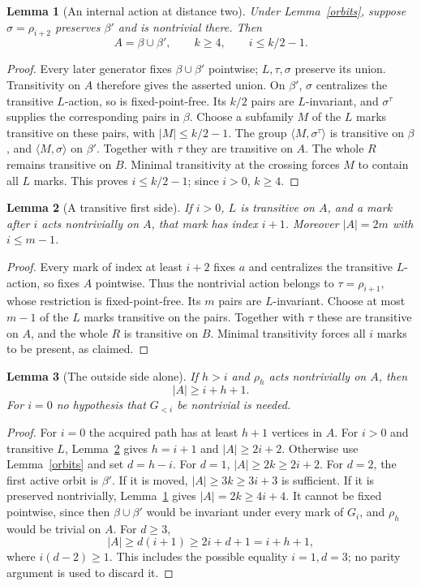 \documentclass[11pt,a4paper]{article}
\newtheorem{lemma}{Lemma}
\newcommand{\gen}[1]{\langle#1\rangle}
\begin{document}
\begin{lemma}[An internal action at distance two]\label{internal}
Under Lemma~\ref{orbits}, suppose $\sigma=\rho_{i+2}$
preserves $\beta'$ and is nontrivial there. Then
\[
              A=\beta\cup\beta',\qquad k\ge4,
              \qquad i\le k/2-1.
\]
\end{lemma}
\begin{proof}
Every later generator fixes $\beta\cup\beta'$ pointwise;
$L,\tau,\sigma$ preserve its union. Transitivity on $A$
therefore gives the asserted union. On $\beta'$, $\sigma$
centralizes the transitive $L$-action, so is fixed-point-free.
Its $k/2$ pairs are $L$-invariant, and $\sigma^\tau$ supplies
the corresponding pairs in $\beta$.
Choose a subfamily $M$ of the $L$ marks transitive on these
pairs, with $|M|\le k/2-1$. The group $\gen{M,\sigma^\tau}$
is transitive on $\beta$, and $\gen{M,\sigma}$ on $\beta'$.
Together with $\tau$ they are transitive on $A$. The whole
$R$ remains transitive on $B$. Minimal transitivity at the
crossing forces $M$ to contain all $L$ marks. This proves
$i\le k/2-1$; since $i>0$, $k\ge4$.
\end{proof}

\begin{lemma}[A transitive first side]\label{transitive}
If $i>0$, $L$ is transitive on $A$, and a mark after $i$
acts nontrivially on $A$, that mark has index $i+1$.
Moreover $|A|=2m$ with $i\le m-1$.
\end{lemma}
\begin{proof}
Every mark of index at least $i+2$ fixes $a$ and centralizes
the transitive $L$-action, so fixes $A$ pointwise. Thus the
nontrivial action belongs to $\tau=\rho_{i+1}$, whose
restriction is fixed-point-free. Its $m$ pairs are $L$-invariant.
Choose at most $m-1$ of the $L$ marks transitive on the pairs.
Together with $\tau$ these are transitive on $A$, and the
whole $R$ is transitive on $B$. Minimal transitivity forces
all $i$ marks to be present, as claimed.
\end{proof}

\begin{lemma}[The outside side alone]\label{outside}
If $h>i$ and $\rho_h$ acts nontrivially on $A$, then
\[
                         |A|\ge i+h+1.
\]
For $i=0$ no hypothesis that $G_{<i}$ be nontrivial is needed.
\end{lemma}
\begin{proof}
For $i=0$ the acquired path has at least $h+1$ vertices in
$A$. For $i>0$ and transitive $L$, Lemma~\ref{transitive}
gives $h=i+1$ and $|A|\ge2i+2$. Otherwise use
Lemma~\ref{orbits} and set $d=h-i$.
For $d=1$, $|A|\ge2k\ge2i+2$. For $d=2$, the first
active orbit is $\beta'$. If it is moved, $|A|\ge3k\ge3i+3$
is sufficient. If it is preserved nontrivially, Lemma~\ref{internal}
gives $|A|=2k\ge4i+4$. It cannot be fixed pointwise, since
then $\beta\cup\beta'$ would be invariant under every mark
of $G_i$, and $\rho_h$ would be trivial on $A$.
For $d\ge3$,
\[
 |A|\ge d(i+1)\ge 2i+d+1=i+h+1,
\]
where $i(d-2)\ge1$. This includes the possible equality
$i=1,d=3$; no parity argument is used to discard it.
\end{proof}
\end{document}
